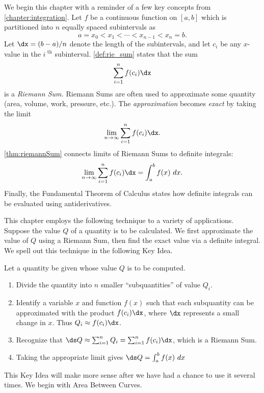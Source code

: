 







We begin this chapter with a reminder of a few key concepts from \autoref{chapter:integration}. Let $f$ be a continuous function on $[a,b]$ which is partitioned into $n$ equally spaced subintervals as 
$$a=x_0 < x_1 < \cdots < x_{n-1}<x_n=b.$$
Let $\dx=(b-a)/n$ denote the length of the  subintervals, and let $c_i$ be any $x$-value in the $i^\text{ th}$ subinterval. \autoref{def:rie_sum} states that the sum $$\sum_{i=1}^n f(c_i)\dx$$ is a \textit{Riemann Sum.} Riemann Sums are often used to approximate some quantity (area, volume, work, pressure, etc.). The \textit{approximation} becomes \textit{exact} by taking the limit 
$$\lim_{n\to\infty} \sum_{i=1}^n f(c_i)\dx.$$ \autoref{thm:riemannSum} connects limits of Riemann Sums to definite integrals:
$$\lim_{n\to\infty} \sum_{i=1}^n f(c_i)\dx = \int_a^b f(x)\ dx.$$ Finally, the Fundamental Theorem of Calculus states how definite integrals can be evaluated using antiderivatives. 

This chapter employs the following technique to a variety of applications. Suppose the value $Q$ of a quantity is to be calculated. We first approximate the value of $Q$ using a Riemann Sum, then find the exact value via a definite integral. We spell out this technique in the following Key Idea.

{Let a quantity be given whose value $Q$ is to be computed.
\begin{enumerate}
\item	Divide the quantity into $n$ smaller ``subquantities'' of value $Q_i$.
\item	Identify a variable $x$ and function $f(x)$ such that each subquantity can be approximated with the product $f(c_i)\dx$, where $\dx$ represents a small change in $x$. Thus $Q_i \approx f(c_i)\dx$.
\item	Recognize that $\ds Q\approx \sum_{i=1}^n Q_i = \sum_{i=1}^n f(c_i)\dx$, which is a Riemann Sum.
\item	Taking the appropriate limit gives $\ds Q = \int_a^b f(x)\ dx$
\end{enumerate}}

This Key Idea will make more sense after we have had a chance to use it several times. We begin with Area Between Curves.%







\cleardoublepage
